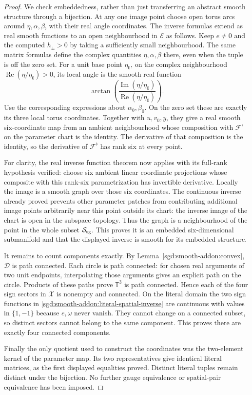 \begin{proof}
We check embeddedness, rather than just transferring an abstract
smooth structure through a bijection.
At any one image point choose open torus arcs around
$\eta,\alpha,\beta$, with their real angle coordinates.
The inverse formulas extend as real smooth functions to an open
neighbourhood in $\mathcal E$ as follows. Keep $e\ne0$ and the
computed $h_\pm>0$ by taking a sufficiently small neighbourhood.
The same matrix formulas define the complex quantities
$\eta,\alpha,\beta$ there, even when the tuple is off the zero set.
For a unit base point $\eta_0$, on the complex neighbourhood
$\operatorname{Re}(\eta/\eta_0)>0$, its local angle is the smooth
real function
\[
 \arctan\!\left(
 \frac{\operatorname{Im}(\eta/\eta_0)}
      {\operatorname{Re}(\eta/\eta_0)}\right).
\]
Use the corresponding expressions about $\alpha_0,\beta_0$.
On the zero set these are exactly its three local torus coordinates.
Together with $u,v_0,y$, they give a real smooth six-coordinate
map from an ambient neighbourhood whose composition with
$\mathcal F^\flat$ on the parameter chart is the identity.
The derivative of that composition is the identity, so the
derivative of $\mathcal F^\flat$ has rank six at every point.

For clarity, the real inverse function theorem
\cite[\S1, pp.~4--5]{sgd:Milnor1965} now applies with
its full-rank hypothesis verified: choose six ambient linear
coordinate projections whose composite with this rank-six
parametrization has invertible derivative. Locally the image is a
smooth graph over those six coordinates.
The continuous inverse already proved prevents other parameter
patches from contributing additional image points arbitrarily near
this point outside its chart: the inverse image of the chart is
open in the subspace topology. Thus the graph is a neighbourhood
of the point in the whole subset $\mathcal S_{\rm sg}$.
This proves it is an embedded six-dimensional submanifold and that
the displayed inverse is smooth for its embedded structure.

It remains to count components exactly. By
Lemma~\ref{sgd:smooth-addon:convex}, $\mathcal D$ is path connected.
Each circle is path connected: for chosen real arguments of two
unit endpoints, interpolating those arguments gives an explicit
path on the circle. Products of these paths prove $\mathbb T^3$
is path connected. Hence each of the four sign sectors in
$\mathcal X$ is nonempty and connected.
On the literal domain the two sign functions in
\eqref{sgd:smooth-addon:literal-spatial-inverse} are continuous
with values in $\{1,-1\}$ because $e,\omega$ never vanish.
They cannot change on a connected subset, so distinct sectors
cannot belong to the same component. This proves there are
exactly four connected components.

Finally the only quotient used to construct the coordinates was
the two-element kernel of the parameter map.
Its two representatives give identical literal matrices, as the
first displayed equalities proved. Distinct literal tuples remain
distinct under the bijection. No further gauge equivalence or
spatial-pair equivalence has been imposed.
\end{proof}

